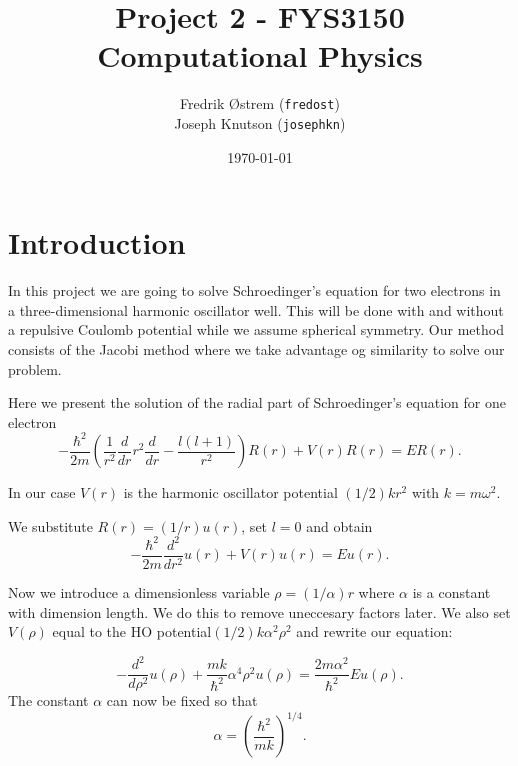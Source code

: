 \documentclass[11pt,a4paper]{article}
\begin{document}
\title{Project 2 - FYS3150 Computational Physics}
\author{Fredrik Østrem (\texttt{fredost}) \\ Joseph Knutson (\texttt{josephkn})}
\date{\today}

\maketitle

\tableofcontents

\clearpage
\section{Introduction}
In this project we are going to solve Schroedinger's equation for two
electrons in a three-dimensional harmonic oscillator well. This will be done with and
without a repulsive Coulomb potential while we assume spherical symmetry. Our method consists of the Jacobi method where we take advantage og similarity to solve our problem.

Here we present the solution of the radial part of Schroedinger's equation for one electron
\begin{equation}
  -\frac{\hbar^2}{2 m} \left ( \frac{1}{r^2} \frac{d}{dr} r^2
  \frac{d}{dr} - \frac{l (l + 1)}{r^2} \right )R(r)
     + V(r) R(r) = E R(r).
\end{equation}

In our case $V(r)$ is the harmonic oscillator potential $(1/2)kr^2$ with $k=m\omega^2$.

We substitute $R(r) = (1/r) u(r)$, set $l = 0$ and obtain
\begin{equation}
  -\frac{\hbar^2}{2 m} \frac{d^2}{dr^2} u(r)
       +  V(r)u(r)  = E u(r) .
\end{equation}

Now we introduce a dimensionless variable $\rho = (1/\alpha) r$
where $\alpha$ is a constant with dimension length. We do this to remove uneccesary factors later. We also set $V(\rho)$ equal to the HO potential$(1/2) k \alpha^2\rho^2$ and rewrite our equation:

\begin{equation}
  -\frac{d^2}{d\rho^2} u(\rho)
       + \frac{mk}{\hbar^2} \alpha^4\rho^2u(\rho)  = \frac{2m\alpha^2}{\hbar^2}E u(\rho) .
\end{equation}
The constant $\alpha$ can now be fixed so that
\begin{equation}
\alpha = \left(\frac{\hbar^2}{mk}\right)^{1/4}.
\end{equation}
\end{document}
